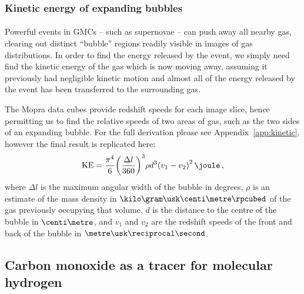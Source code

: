 \documentclass[a4paper, titlepage, oneside]{article}
\begin{document}
\begin{multicols}{2}
\subsubsection{Kinetic energy of expanding bubbles}
\label{sec:kinetic}
\paragraph{}
Powerful events in GMCs -- such as supernovae -- can push away all nearby gas, clearing out distinct ``bubble'' regions readily visible in images of gas distributions. In order to find the energy released by the event, we simply need find the kinetic energy of the gas which is now moving away, assuming it previously had negligible kinetic motion and almost all of the energy released by the event has been transferred to the surrounding gas.

The Mopra data cubes provide redshift speeds for each image slice, hence permitting us to find the relative speeds of two areas of gas, such as the two sides of an expanding bubble. For the full derivation please see Appendix~\ref{app:kinetic}, however the final result is replicated here:
\begin{equation}
  \label{eq:KE}
  \mathrm{KE} = \frac{\pi ^ 4}{6} {\left( \frac{\Delta l}{360} \right)}^3 \rho d^3 {(v_1 - v_2)}^2 \, \joule \, ,
\end{equation}
where \(\Delta l\) is the maximum angular width of the bubble in degrees, \(\rho\) is an estimate of the mass density in \(\kilo\gram\usk\centi\metre\rpcubed\) of the gas previously occupying that volume, \(d\) is the distance to the centre of the bubble in \(\centi\metre\), and \(v_1\) and \(v_2\) are the redshift speeds of the front and back of the bubble in \(\metre\usk\reciprocal\second\).

\subsection{Carbon monoxide as a tracer for molecular hydrogen}
\label{sec:co}

\end{multicols}
\end{document}
